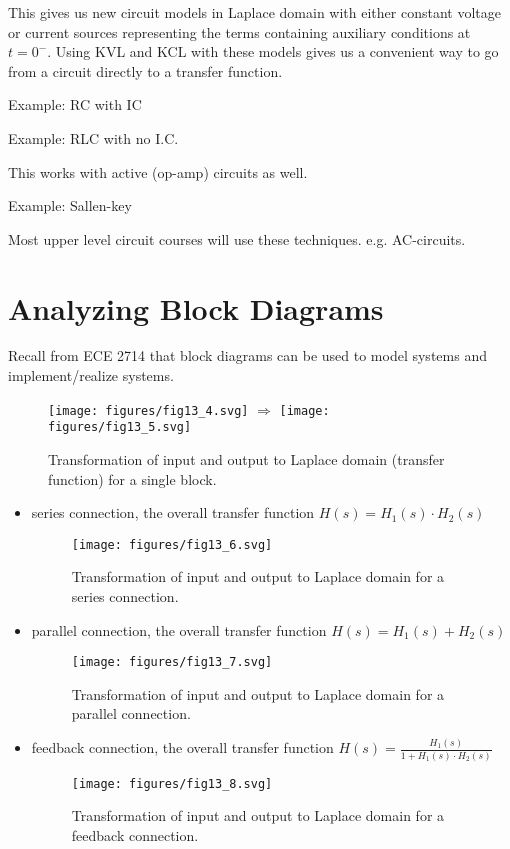 \documentclass{article}
\begin{document}
This gives us new circuit models in Laplace domain with either constant voltage or current sources representing the terms containing auxiliary conditions at $t=0^-$. Using KVL and KCL with these models gives us a convenient way to go from a circuit directly to a transfer function.

Example: RC with IC

Example: RLC with no I.C.

This works with active (op-amp) circuits as well.

Example: Sallen-key

Most upper level circuit courses will use these techniques. e.g. AC-circuits.

\section{Analyzing Block Diagrams}

Recall from ECE 2714 that block diagrams can be used to model systems and implement/realize systems.

\begin{figure}
  \centering
  \texttt{[image: figures/fig13\_4.svg]}
  $\Longrightarrow$
    \texttt{[image: figures/fig13\_5.svg]}
  \caption{Transformation of input and output to Laplace domain (transfer function) for a single block.}
\end{figure}

\begin{itemize}
\item series connection, the overall transfer function $H(s) = H_1(s)\cdot H_2(s)$ 
\begin{figure}
  \centering
  \texttt{[image: figures/fig13\_6.svg]}
  \caption{Transformation of input and output to Laplace domain for a series connection.}
\end{figure}

\item parallel connection, the overall transfer function $H(s) = H_1(s)+ H_2(s)$ 
\begin{figure}
  \centering
  \texttt{[image: figures/fig13\_7.svg]}
  \caption{Transformation of input and output to Laplace domain for a parallel connection.}
\end{figure}

\item feedback connection, the overall transfer function $H(s) = \frac{H_1(s)}{1+ H_1(s)\cdot H_2(s)}$ 
\begin{figure}
  \centering
  \texttt{[image: figures/fig13\_8.svg]}
  \caption{Transformation of input and output to Laplace domain for a feedback connection.}
\end{figure}
\end{itemize}
\end{document}
